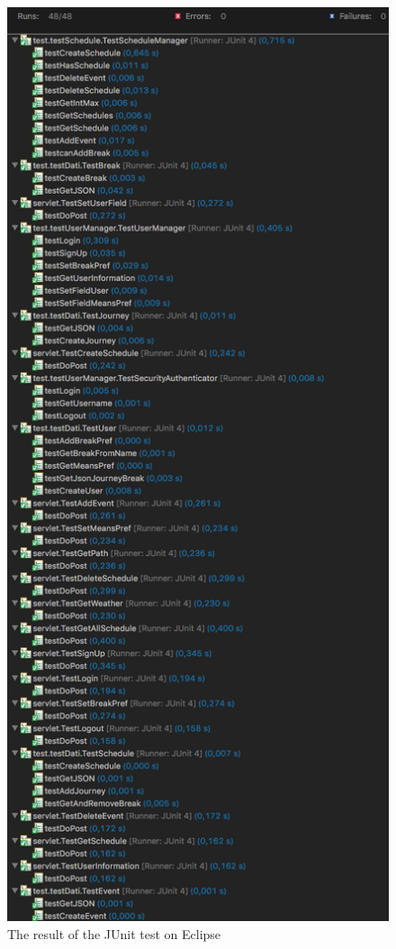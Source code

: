 \documentclass[numbers=noenddot, 12pt, a4paper, oneside]{scrbook}
\begin{document}
\begin{figure}[H]
	\centering
	\includegraphics[width=1.1\textwidth]{Test/ServerEclipse}
	\caption{The result of the JUnit test on Eclipse}
\end{figure}
\end{document}
